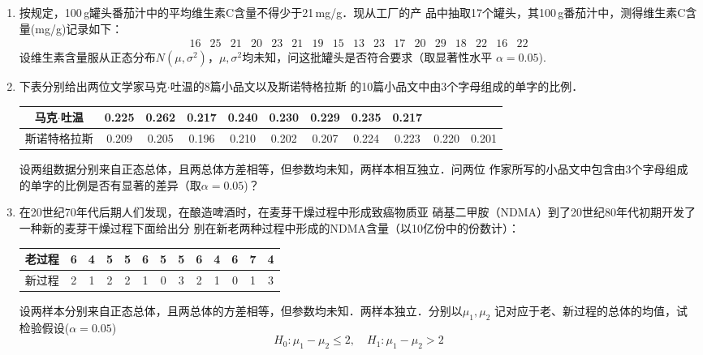 \documentclass[10pt,a4paper]{article}
\begin{document}
\begin{enumerate}
    \item 按规定，100$\, $g罐头番茄汁中的平均维生素C含量不得少于21$\, $mg/g．现从工厂的产
    品中抽取17个罐头，其100$\, $g番茄汁中，测得维生素C含量(mg/g)记录如下：
    $$\begin{array}{ccccccccccccccccc}
        16 & 25 &  21 & 20 & 23 & 21 & 19 & 15 & 13 & 23 & 17 & 20 & 29 & 18 & 22 & 16 &  22
    \end{array}$$
    设维生素含量服从正态分布$N(\mu,\sigma^2)$，$\mu,\sigma^2$均未知，问这批罐头是否符合要求（取显著性水平
    $\alpha=0.05$).





    \item 下表分别给出两位文学家马克$\cdot$吐温的8篇小品文以及斯诺特格拉斯
    的10篇小品文中由3个字母组成的单字的比例．
    \renewcommand{\arraystretch}{1.3}
    \begin{table}[H]\centering
        \begin{tabular}{c|cccccccccc}
        马克$\cdot$吐温 & 0.225 & 0.262 & 0.217 & 0.240 & 0.230 & 0.229 & 0.235 & 0.217 &  &  \\ \hline
        斯诺特格拉斯 & 0.209 & 0.205 & 0.196 & 0.210 & 0.202 & 0.207 & 0.224 & 0.223 & 0.220 & 0.201
    \end{tabular}
    \end{table}
    \renewcommand{\arraystretch}{1.0}
    设两组数据分别来自正态总体，且两总体方差相等，但参数均未知，两样本相互独立．问两位
    作家所写的小品文中包含由3个字母组成的单字的比例是否有显著的差异（取$\alpha=0.05$)？




    \item 在20世纪70年代后期人们发现，在酿造啤酒时，在麦芽干燥过程中形成致癌物质亚
    硝基二甲胺（NDMA）到了20世纪80年代初期开发了一种新的麦芽干燥过程下面给出分
    别在新老两种过程中形成的NDMA含量（以10亿份中的份数计）：
    \renewcommand{\arraystretch}{1.3}
    \begin{table}[H]\centering
    \begin{tabular}{c|cccccccccccc}
    老过程 & 6 & 4 & 5 & 5 & 6 & 5 & 5 & 6 & 4 & 6 & 7 & 4 \\ \hline
    新过程 & 2 & 1 & 2 & 2 & 1 & 0 & 3 & 2 & 1 & 0 & 1 & 3
    \end{tabular}
    \end{table}
    \renewcommand{\arraystretch}{1.0}
    设两样本分别来自正态总体，且两总体的方差相等，但参数均未知．两样本独立．分别以$\mu_1,\mu_2$
    记对应于老、新过程的总体的均值，试检验假设($\alpha=0.05$)
    $$H_0:\mu_1-\mu_2\leq 2,\quad H_1:\mu_1-\mu_2>2$$





\end{enumerate}
\end{document}
